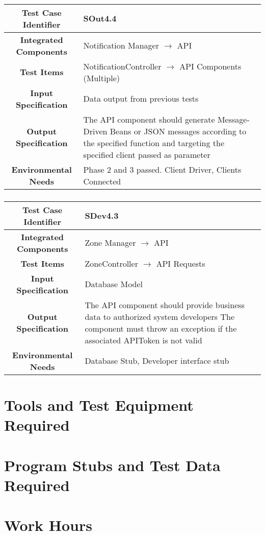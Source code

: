 \documentclass[11pt, a4paper,titlepage]{article}
\begin{document}
			\subsubsection{}
			\begin{tabularx}{\textwidth}{| c|X|}
				\hline \textbf{Test Case Identifier} & \label{SOut4.4 }SOut4.4 \\
				\hline \textbf{Integrated Components} & Notification Manager $\rightarrow $ API \\
				\hline \textbf{Test Items} & NotificationController $\rightarrow $ API Components (Multiple) \\
				\hline \textbf{Input Specification} & Data output from previous tests \\
				\hline \textbf{Output Specification} & The API component should generate Message-Driven Beans or JSON messages according to the specified function and targeting the specified client passed as parameter \\
				\hline \textbf{Environmental Needs} & Phase 2 and 3 passed. Client Driver, Clients Connected \\
				\hline
			\end{tabularx}
			\newline
			\subsubsection{}
			\begin{tabularx}{\textwidth}{| c|X|}
				\hline \textbf{Test Case Identifier} & \label{SDev4.3}SDev4.3 \\
				\hline \textbf{Integrated Components} & Zone Manager $\rightarrow $ API \\
				\hline \textbf{Test Items} & ZoneController $\rightarrow $ API Requests \\
				\hline \textbf{Input Specification} & Database Model \\
				\hline \textbf{Output Specification} & The API component should provide business data to authorized system developers
				\newline The component must throw an exception if the associated APIToken is not valid \\
				\hline \textbf{Environmental Needs} & Database Stub, Developer interface stub \\
				\hline
			\end{tabularx}
			\newline
			
	\newpage
	\section{Tools and Test Equipment Required}
	\section{Program Stubs and Test Data Required}
	\section{Work Hours}
	
\end{document}
